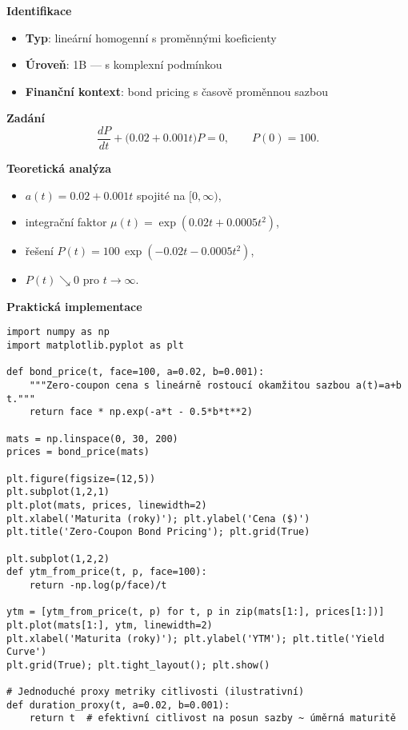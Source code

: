 \begin{example}
\label{ex:1b3}

\textbf{Identifikace}
\begin{itemize}
\item \textbf{Typ}: lineární homogenní s proměnnými koeficienty
\item \textbf{Úroveň}: 1B — s komplexní podmínkou
\item \textbf{Finanční kontext}: bond pricing s časově proměnnou sazbou
\end{itemize}

\textbf{Zadání}
\[
\frac{dP}{dt} + \bigl(0.02 + 0.001t\bigr)P = 0, \qquad P(0)=100.
\]

\textbf{Teoretická analýza}
\begin{itemize}
\item $a(t)=0.02+0.001t$ spojité na $[0,\infty)$,
\item integrační faktor $\mu(t)=\exp\!\left(0.02t+0.0005t^2\right)$,
\item řešení $P(t)=100\,\exp\!\left(-0.02t-0.0005t^2\right)$,
\item $P(t)\searrow 0$ pro $t\to\infty$.
\end{itemize}

\textbf{Praktická implementace}
\begin{verbatim}
import numpy as np
import matplotlib.pyplot as plt

def bond_price(t, face=100, a=0.02, b=0.001):
    """Zero-coupon cena s lineárně rostoucí okamžitou sazbou a(t)=a+b t."""
    return face * np.exp(-a*t - 0.5*b*t**2)

mats = np.linspace(0, 30, 200)
prices = bond_price(mats)

plt.figure(figsize=(12,5))
plt.subplot(1,2,1)
plt.plot(mats, prices, linewidth=2)
plt.xlabel('Maturita (roky)'); plt.ylabel('Cena ($)')
plt.title('Zero-Coupon Bond Pricing'); plt.grid(True)

plt.subplot(1,2,2)
def ytm_from_price(t, p, face=100):
    return -np.log(p/face)/t

ytm = [ytm_from_price(t, p) for t, p in zip(mats[1:], prices[1:])]
plt.plot(mats[1:], ytm, linewidth=2)
plt.xlabel('Maturita (roky)'); plt.ylabel('YTM'); plt.title('Yield Curve')
plt.grid(True); plt.tight_layout(); plt.show()

# Jednoduché proxy metriky citlivosti (ilustrativní)
def duration_proxy(t, a=0.02, b=0.001):
    return t  # efektivní citlivost na posun sazby ~ úměrná maturitě


\end{verbatim}
\end{example}
